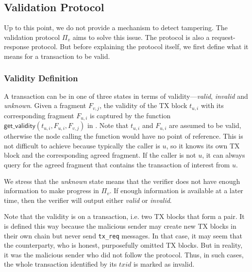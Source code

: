 \subsection{Validation Protocol}
\label{sec:vd-protocol}

Up to this point, we do not provide a mechanism to detect tampering.
The validation protocol $\Pi_v$ aims to solve this issue.
The protocol is also a request-response protocol.
But before explaining the protocol itself, we first define what it means for a transaction to be valid.

\subsubsection{Validity Definition}
A transaction can be in one of three states in terms of validity---\emph{valid}, \emph{invalid} and \emph{unknown}.
Given a fragment $F_{v, j}$,
the validity of the TX block $t_{u, i}$ with its corresponding fragment $F_{u, i}$ is captured by the function $\textsf{get\_validity}(t_{u, i}, F_{u, i}, F_{v, j})$ in .
Note that $t_{u, i}$ and $F_{u, i}$ are assumed to be valid,
otherwise the node calling the function would have no point of reference.
This is not difficult to achieve because typically the caller is $u$,
so it knows its own TX block and the corresponding agreed fragment.
If the caller is not $u$, it can always query for the agreed fragment that contains the transaction of interest from $u$.


We stress that the \emph{unknown} state means that the verifier does not have enough information to make progress in $\Pi_v$.
If enough information is available at a later time, then the verifier will output either \emph{valid} or \emph{invalid}.

Note that the validity is on a transaction, i.e. two TX blocks that form a pair.
It is defined this way because the malicious sender may create new TX blocks in their own chain but never send \texttt{tx\_req} messages.
In that case, it may seem that the counterparty, who is honest, purposefully omitted TX blocks.
But in reality, it was the malicious sender who did not follow the protocol.
Thus, in such cases, the whole transaction identified by its $txid$ is marked as invalid.

